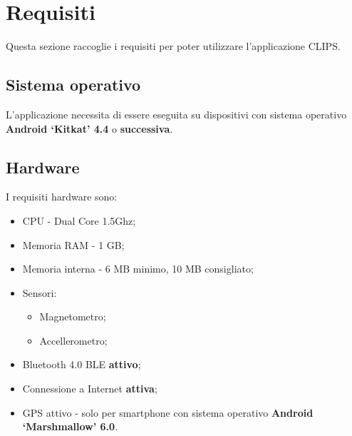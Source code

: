 \documentclass[../ClipsManualeUtente.tex]{subfiles}
\begin{document}
\section{Requisiti}
	Questa sezione raccoglie i requisiti per poter utilizzare l'applicazione CLIPS.
	
	\subsection{Sistema operativo}
		L'applicazione necessita di essere eseguita su dispositivi con sistema operativo \textbf{Android `Kitkat' 4.4} o \textbf{successiva}.
	
	\subsection{Hardware}
		I requisiti hardware sono:
		\begin{itemize}
			\item CPU - Dual Core 1.5Ghz;
			\item Memoria RAM - 1 GB;
			\item Memoria interna - 6 MB minimo, 10 MB consigliato;
			\item Sensori:
			\begin{itemize}
				\item Magnetometro;
				\item Accellerometro;
			\end{itemize}
			\item \gls{Bluetooth} 4.0 \gls{BLE} \textbf{attivo};
			\item Connessione a Internet \textbf{attiva};
			\item GPS attivo - solo per smartphone con sistema operativo \textbf{Android `Marshmallow' 6.0}.
		\end{itemize}
		
	
		
\end{document}
